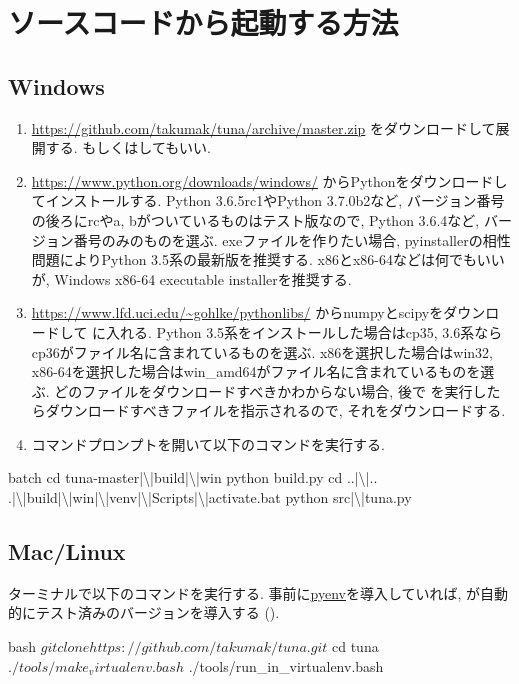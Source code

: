 \clearpage
\section{ソースコードから起動する方法}

\subsection{Windows}

\begin{enumerate}
\item \url{https://github.com/takumak/tuna/archive/master.zip}
  をダウンロードして展開する.
  もしくはしてもいい.
\item \url{https://www.python.org/downloads/windows/}
  からPythonをダウンロードしてインストールする.
  Python 3.6.5rc1やPython 3.7.0b2など, バージョン番号の後ろにrcやa, bがついているものはテスト版なので,
  Python 3.6.4など, バージョン番号のみのものを選ぶ.
  exeファイルを作りたい場合, pyinstallerの相性問題によりPython 3.5系の最新版を推奨する.
  x86とx86-64などは何でもいいが, Windows x86-64 executable installerを推奨する.
\item \url{https://www.lfd.uci.edu/~gohlke/pythonlibs/}
  からnumpyとscipyをダウンロードして  に入れる.
  Python 3.5系をインストールした場合はcp35, 3.6系ならcp36がファイル名に含まれているものを選ぶ.
  x86を選択した場合はwin32, x86-64を選択した場合はwin\_amd64がファイル名に含まれているものを選ぶ.
  どのファイルをダウンロードすべきかわからない場合, 後で 
  を実行したらダウンロードすべきファイルを指示されるので, それをダウンロードする.
\item コマンドプロンプトを開いて以下のコマンドを実行する.
\end{enumerate}

\begin{codeb}{batch}
  cd tuna-master|\textbackslash|build|\textbackslash|win
  python build.py
  cd ..|\textbackslash|..
  .|\textbackslash|build|\textbackslash|win|\textbackslash|venv|\textbackslash|Scripts|\textbackslash|activate.bat
  python src|\textbackslash|tuna.py
\end{codeb}

\subsection{Mac/Linux}

ターミナルで以下のコマンドを実行する.
事前に\href{https://github.com/pyenv/pyenv}{pyenv}を導入していれば,
 が自動的にテスト済みのバージョンを導入する%
().

\begin{codeb}{bash}
  $ git clone https://github.com/takumak/tuna.git
  $ cd tuna
  $ ./tools/make_virtualenv.bash
  $ ./tools/run_in_virtualenv.bash
\end{codeb}

